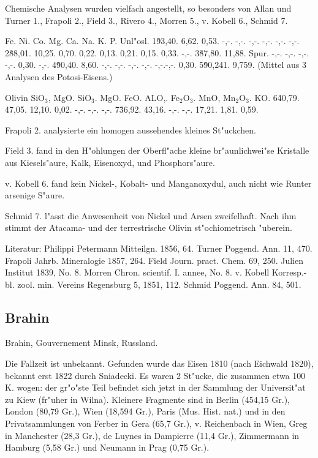 \documentclass[a4paper, 11pt, oneside]{article}
\begin{document}
Chemische Analysen wurden vielfach angestellt, so besonders von
Allan und Turner 1., Frapoli 2., Field 3., Rivero 4., Morren 5.,
v. Kobell 6., Schmid 7.

Fe. Ni. Co. Mg. Ca. Na. K. P. Unl"osl.  
1\. 93,40. 6,62. 0,53. -,-. -,-. -,-. -,-. -,-. -,-.  
2\. 88,01. 10,25. 0,70. 0,22. 0,13. 0,21. 0,15. 0,33. -,-.  
3\. 87,80. 11,88. Spur. -,-. -,-. -,-. -,-. 0,30. -,-.  
4\. 90,40. 8,60. -,-. -,-. -,-. -,-. -,-.-,-. 0,30.  
5\. 90,241. 9,759. (Mittel aus 3 Analysen des Potosi-Eisens.)

Olivin { SiO$_{3}$, MgO. }  
SiO$_{3}$. MgO. FeO. ALO,. Fe$_{2}$O$_{3}$. MnO, Mn$_{2}$O$_{3}$. KO.  
6\. 40,79. 47,05. 12,10. 0,02. -,-. -,-. -,-.  
7\. 36,92. 43,16. -,-. -,-. 17,21. 1,81. 0,59.

Frapoli 2. analysierte ein homogen aussehendes kleines St"uckchen.

Field 3. fand in den H"ohlungen der Oberfl"ache kleine br"aunlichwei"se Kristalle aus Kiesels"aure, Kalk, Eisenoxyd, und Phosphors"aure.

v. Kobell 6. fand kein Nickel-, Kobalt- und Manganoxydul, auch nicht wie Runter arsenige S"aure.

Schmid 7. l"asst die Anwesenheit von Nickel und Arsen zweifelhaft. Nach ihm stimmt der Atacama- und der terrestrische Olivin st"ochiometrisch "uberein.

Literatur: Philippi Petermann Mitteilgn. 1856, 64. Turner Poggend. Ann. 11, 470. Frapoli Jahrb. Mineralogie 1857, 264. Field Journ. pract. Chem. 69, 250. Julien Institut 1839, No. 8. Morren Chron. scientif. I. annee, No. 8. v. Kobell Korresp.-bl. zool. min. Vereins Regensburg 5, 1851, 112. Schmid Poggend. Ann. 84, 501.

\subsection{Brahin}

Brahin, Gouvernement Minsk, Russland.

Die Fallzeit ist unbekannt. Gefunden wurde das Eisen 1810 (nach Eichwald 1820), bekannt erst 1822 durch Sniadecki. Es waren 2 St"ucke, die zusammen etwa 100 K. wogen: der gr"o"ste Teil befindet sich jetzt in der Sammlung der Universit"at zu Kiew (fr"uher in Wilna). Kleinere Fragmente sind in Berlin (454,15 Gr.), London (80,79 Gr.), Wien (18,594 Gr.), Paris (Mus. Hist. nat.) und in den Privatsammlungen von Ferber in Gera (65,7 Gr.), v. Reichenbach in Wien, Greg in Manchester (28,3 Gr.), de Luynes in Dampierre (11,4 Gr.), Zimmermann in Hamburg (5,58 Gr.) und Neumann in Prag (0,75 Gr.).
\end{document}

